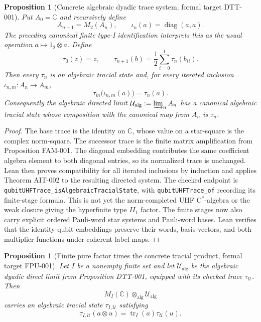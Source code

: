 \documentclass{article}
\newtheorem{proposition}[definition]{Proposition}
\begin{document}
\begin{proposition}[Concrete algebraic dyadic trace system, formal target DTT-001]
\label{prop:concrete_dyadic_trace}
Put $A_0=\mathbb C$ and recursively define
\begin{equation*}
  A_{n+1}=M_2(A_n),
  \qquad
  \iota_n(a)=\operatorname{diag}(a,a).
\end{equation*}
The preceding canonical finite type-I identification interprets this as the
usual operation $a\mapsto 1_2\otimes a$.  Define
\begin{equation*}
  \tau_0(z)=z,
  \qquad
  \tau_{n+1}(b)=\frac12\sum_{i=0}^1\tau_n(b_{ii}).
\end{equation*}
Then every $\tau_n$ is an algebraic tracial state and, for every iterated
inclusion $\iota_{n,m}:A_n\to A_m$,
\begin{equation*}
  \tau_m\bigl(\iota_{n,m}(a)\bigr)=\tau_n(a).
\end{equation*}
Consequently the algebraic directed limit
$\mathcal U_{\mathrm{alg}}:=\varinjlim_n A_n$ has a canonical algebraic tracial
state whose composition with the canonical map from $A_n$ is $\tau_n$.
\end{proposition}

\begin{proof}
The base trace is the identity on \(\mathbb C\), whose value on a star-square
is the complex norm-square.  The successor trace is the finite matrix
amplification from Proposition FAM-001.  The diagonal embedding contributes
the same coefficient algebra element to both diagonal entries, so its
normalized trace is unchanged.  Lean then proves compatibility for all
iterated inclusions by induction and applies Theorem AIT-002 to the resulting
directed system.  The checked endpoint is
\texttt{qubitUHFTrace\_isAlgebraicTracialState}, with
\texttt{qubitUHFTrace\_of} recording its finite-stage formula.  This is
not yet the norm-completed UHF C$^*$-algebra or the weak closure giving the
hyperfinite type $II_1$ factor.  The finite stages now also carry explicit
ordered Pauli-word star systems and Pauli-word bases.  Lean verifies that the
identity-qubit embeddings preserve their words, basis vectors, and both
multiplier functions under coherent label maps.
\end{proof}

\begin{proposition}[Finite pure factor times the concrete tracial product,
formal target FPU-001]
\label{prop:finite_pure_qubit_product}
Let $I$ be a nonempty finite set and let
$\mathcal U_{\mathrm{alg}}$ be the algebraic dyadic direct limit from
Proposition DTT-001, equipped with its checked trace
$\tau_{\mathcal U}$.  Then
\begin{equation*}
  M_I(\mathbb C)\otimes_{\mathrm{alg}}\mathcal U_{\mathrm{alg}}
\end{equation*}
carries an algebraic tracial state $\tau_{I,\mathcal U}$ satisfying
\begin{equation*}
  \tau_{I,\mathcal U}(a\otimes u)
  =\operatorname{tr}_I(a)\tau_{\mathcal U}(u).
\end{equation*}
\end{proposition}
\end{document}
